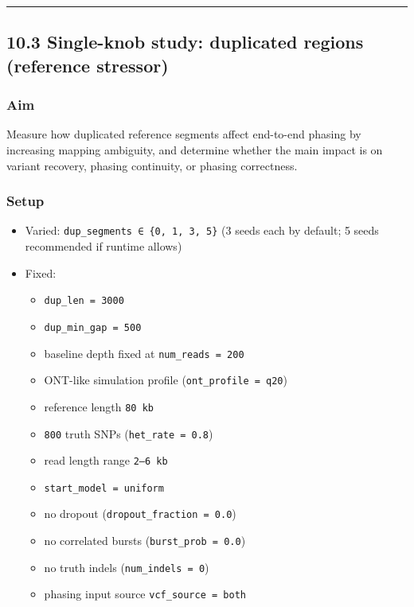 \documentclass[
]{article}
\providecommand{\tightlist}{%
  \setlength{\itemsep}{0pt}\setlength{\parskip}{0pt}}
\begin{document}
\begin{center}\rule{0.5\linewidth}{0.5pt}\end{center}

\subsection{10.3 Single-knob study: duplicated regions (reference
stressor)}\label{single-knob-study-duplicated-regions-reference-stressor}

\subsubsection{Aim}\label{aim-1}

Measure how duplicated reference segments affect end-to-end phasing by
increasing mapping ambiguity, and determine whether the main impact is
on variant recovery, phasing continuity, or phasing correctness.

\subsubsection{Setup}\label{setup-1}

\begin{itemize}
\tightlist
\item
  Varied: \texttt{dup\_segments\ ∈\ \{0,\ 1,\ 3,\ 5\}} (3 seeds each by
  default; 5 seeds recommended if runtime allows)
\item
  Fixed:

  \begin{itemize}
  \tightlist
  \item
    \texttt{dup\_len\ =\ 3000}
  \item
    \texttt{dup\_min\_gap\ =\ 500}
  \item
    baseline depth fixed at \texttt{num\_reads\ =\ 200}
  \item
    ONT-like simulation profile (\texttt{ont\_profile\ =\ q20})
  \item
    reference length \texttt{80\ kb}
  \item
    \texttt{800} truth SNPs (\texttt{het\_rate\ =\ 0.8})
  \item
    read length range \texttt{2–6\ kb}
  \item
    \texttt{start\_model\ =\ uniform}
  \item
    no dropout (\texttt{dropout\_fraction\ =\ 0.0})
  \item
    no correlated bursts (\texttt{burst\_prob\ =\ 0.0})
  \item
    no truth indels (\texttt{num\_indels\ =\ 0})
  \item
    phasing input source \texttt{vcf\_source\ =\ both}
  \end{itemize}
\end{itemize}
\end{document}
